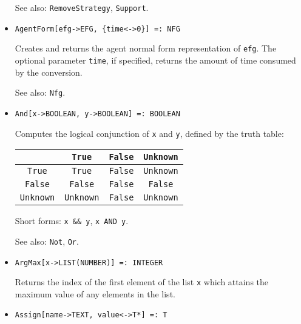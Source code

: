 \begin{itemize}
\item [See also:] \verb+RemoveStrategy+, \verb+Support+.
\ed

\item{}
\protect \large \begin{verbatim}
AgentForm[efg->EFG, {time<->0}] =: NFG 
\end{verbatim}\normalsize

\bd
Creates and returns the agent normal form representation of \verb+efg+.
The optional parameter \verb+time+, if specified, returns the amount
of time consumed by the conversion.

\item [See also:] \verb+Nfg+.
\ed

\item{} 
\protect \large \begin{verbatim}
And[x->BOOLEAN, y->BOOLEAN] =: BOOLEAN 
\end{verbatim} \normalsize

\bd
Computes the logical conjunction of \verb+x+ and \verb+y+, defined by the
truth table:
\begin{center}
\begin{tabular} {|c||c|c|c|} \hline
& \verb+True+ & \verb+False+ & \verb+Unknown+ \\ \hline 
\verb+True+ & \verb+True+ & \verb+False+ & \verb+Unknown+ \\
\verb+False+ & \verb+False+ & \verb+False+ & \verb+False+ \\
\verb+Unknown+ & \verb+Unknown+ & \verb+False+ & \verb+Unknown+ \\ \hline
\end{tabular}
\end{center}

\item [Short forms:] \verb+x && y+, \verb+x AND y+.
\item [See also:] \verb+Not+, \verb+Or+.
\ed



\item{} 
\protect \large \begin{verbatim}
ArgMax[x->LIST(NUMBER)] =: INTEGER 
\end{verbatim} \normalsize

\bd 
Returns the index of the first element of the list \verb+x+ which
attains the maximum value of any elements in the list.  
\ed

\item{} 
\protect \large \begin{verbatim}
Assign[name->TEXT, value<->T*] =: T
\end{verbatim} \normalsize


\end{itemize}
